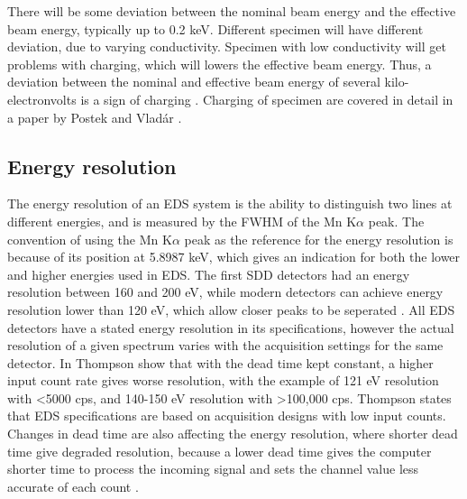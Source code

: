 
There will be some deviation between the nominal beam energy and the effective beam energy, typically up to 0.2 keV.
Different specimen will have different deviation, due to varying conductivity.
Specimen with low conductivity will get problems with charging, which will lowers the effective beam energy.
Thus, a deviation between the nominal and effective beam energy of several kilo-electronvolts is a sign of charging \cite{dtsaii_2_manipulating_spectra}.
Charging of specimen are covered in detail in a paper by Postek and Vladár \cite{postek_charging_2015}.






\subsection{Energy resolution}
\label{theory:qc:energyres}


The energy resolution of an EDS system is the ability to distinguish two lines at different energies, and is measured by the FWHM of the Mn K$\alpha$ peak.
The convention of using the Mn K$\alpha$ peak as the reference for the energy resolution is because of its position at 5.8987 keV, which gives an indication for both the lower and higher energies used in EDS.
The first SDD  detectors had an energy resolution between 160 and 200 eV, while modern detectors can achieve energy resolution lower than 120 eV, which allow closer peaks to be seperated \cite{keith_energy_res_2013} .
All EDS detectors have a stated energy resolution in its specifications, however the actual resolution of a given spectrum varies with the acquisition settings for the same detector.
In \cite{keith_energy_res_2013} Thompson show that with the dead time kept constant, a higher input count rate gives worse resolution, with the example of 121 eV resolution with <5000 cps, and 140-150 eV resolution with >100,000 cps.
Thompson states that EDS specifications are based on acquisition designs with low input counts.
Changes in dead time are also affecting the energy resolution, where shorter dead time give degraded resolution, because a lower dead time gives the computer shorter time to process the incoming signal and sets the channel value less accurate of each count .

